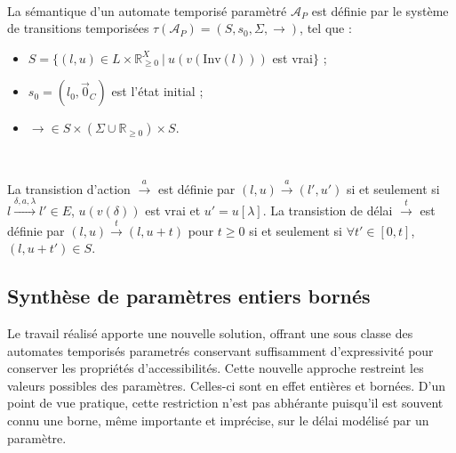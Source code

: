         ~

        La sémantique d'un automate temporisé paramètré $\mathcal{A}_P$ est
        définie par le système de transitions temporisées $\tau(\mathcal{A}_P) =
        (S,s_0,\Sigma,\rightarrow)$, tel que :
        
        \begin{itemize}
          \item $S = \{(l,u) \in L \times \mathbb{R}_{\geq 0}^X ~|~
            u(v(\mathrm{Inv}(l)))$ est vrai$\}$ ;
          \item $s_0 = (l_0, \vec{0}_C)$ est l'état initial ;
          \item $\rightarrow \in S \times (\Sigma \cup \mathbb{R}_{\geq 0})
            \times S$.
        \end{itemize}
        
        ~
        
        La transistion d'action $\xrightarrow{a}$ est définie par $(l,u)
        \xrightarrow{a} (l',u')$ si et seulement si $l \xrightarrow{\delta,a,
          \lambda} l' \in E$, $u(v(\delta))$ est vrai et $u' = u[\lambda]$. La
        transistion de délai $\xrightarrow{t}$ est définie par $(l,u)
        \xrightarrow{t} (l,u+t)$ pour $t \geq 0$ si et seulement si $\forall t'
        \in [0,t]$, $(l,u+t') \in S$.

    \subsection{Synthèse de paramètres entiers bornés}

      
      Le travail réalisé \cite{jovanovic14} apporte une nouvelle solution,
      offrant une sous classe des automates temporisés parametrés conservant
      suffisamment d'expressivité pour conserver les propriétés
      d'accessibilités. Cette nouvelle approche restreint les valeurs possibles
      des paramètres. Celles-ci sont en effet entières et bornées. D'un
      point de vue pratique, cette restriction n'est pas abhérante puisqu'il est
      souvent connu une borne, même importante et imprécise, sur le délai
      modélisé par un paramètre.
      
